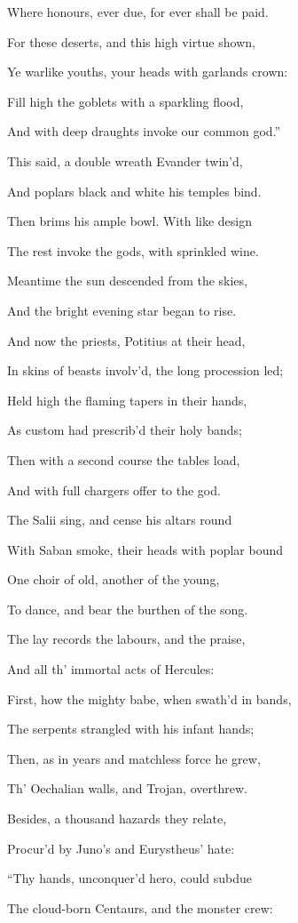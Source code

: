 Where honours, ever due, for ever shall be paid.

For these deserts, and this high virtue shown,

Ye warlike youths, your heads with garlands crown:

Fill high the goblets with a sparkling flood,

And with deep draughts invoke our common god.”

This said, a double wreath Evander twin’d,

And poplars black and white his temples bind.

Then brims his ample bowl. With like design

The rest invoke the gods, with sprinkled wine.

Meantime the sun descended from the skies,

And the bright evening star began to rise.

And now the priests, Potitius at their head,

In skins of beasts involv’d, the long procession led;

Held high the flaming tapers in their hands,

As custom had prescrib’d their holy bands;

Then with a second course the tables load,

And with full chargers offer to the god.

The Salii sing, and cense his altars round

With Saban smoke, their heads with poplar bound

One choir of old, another of the young,

To dance, and bear the burthen of the song.

The lay records the labours, and the praise,

And all th’ immortal acts of Hercules:

First, how the mighty babe, when swath’d in bands,

The serpents strangled with his infant hands;

Then, as in years and matchless force he grew,

Th’ Oechalian walls, and Trojan, overthrew.

Besides, a thousand hazards they relate,

Procur’d by Juno’s and Eurystheus’ hate:

“Thy hands, unconquer’d hero, could subdue

The cloud-born Centaurs, and the monster crew:

